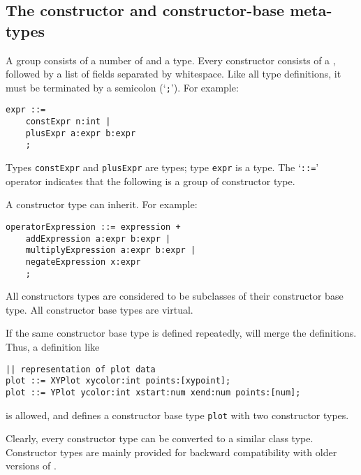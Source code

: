 \subsection{The constructor and constructor-base meta-types}
A  group consists of a number of 
and a  type.
Every constructor consists of a , followed by a 
list of fields separated by whitespace.
Like all type definitions, it must be terminated by a semicolon (`\verb';'').
For example:
\begin{showfile}
\begin{verbatim}
expr ::=
    constExpr n:int |
    plusExpr a:expr b:expr
    ;
\end{verbatim}
\end{showfile}
Types {\tt constExpr} and {\tt plusExpr} are  types;
type {\tt expr} is a  type.
The `\verb'::='' operator indicates that the following is a group of
constructor type.
\par
A constructor type can inherit. For example:
\begin{showfile}
\begin{verbatim}
operatorExpression ::= expression +
    addExpression a:expr b:expr |
    multiplyExpression a:expr b:expr |
    negateExpression x:expr
    ;
\end{verbatim}
\end{showfile}
All constructors types are considered to be subclasses of their
constructor base type. All constructor base types are virtual.
\par
If the same constructor base type is defined repeatedly, {\Tm} will merge the
definitions.
Thus, a definition like
\begin{showfile}
\begin{verbatim}
|| representation of plot data
plot ::= XYPlot xycolor:int points:[xypoint];
plot ::= YPlot ycolor:int xstart:num xend:num points:[num];
\end{verbatim}
\end{showfile}
is allowed, and defines a constructor base type {\tt plot} with two
constructor types.
\par
Clearly, every constructor type can be converted to a similar class type.
Constructor types are mainly provided for backward compatibility with
older versions of {\Tm}.
